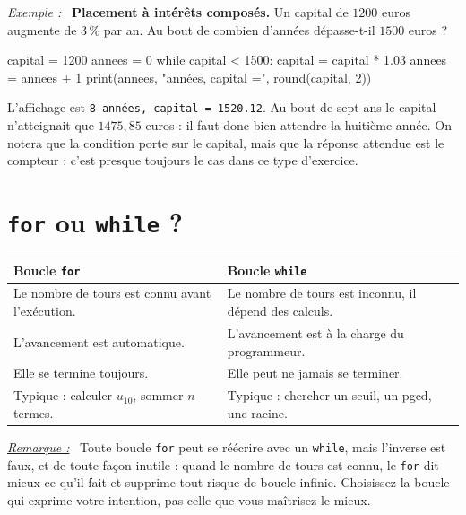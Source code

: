 \documentclass[a4paper,11pt,openany]{book}
\newcommand{\code}[1]{\texttt{\textcolor{codebleu}{#1}}}
\newenvironment{exemple}%
 {\par\vspace{1mm}\begin{list}{}{\leftmargin=1cm \rightmargin=0.5cm}\item[]%
  \textit{Exemple :}~}%
 {\end{list}\vspace{1mm}}
\newenvironment{remarque}%
 {\par\vspace{1mm}\begin{list}{}{\leftmargin=1cm \rightmargin=0.5cm}\item[]%
  \textit{\underline{Remarque :}}~}%
 {\end{list}\vspace{1mm}}
\renewcommand{\arraystretch}{1.4}
\begin{document}
\begin{exemple}
\textbf{Placement à intérêts composés.} Un capital de $1200$ euros augmente de $3\,\%$ par an. Au bout de combien d'années dépasse-t-il $1500$ euros ?
\begin{python}
capital = 1200
annees = 0
while capital < 1500:
    capital = capital * 1.03
    annees = annees + 1
print(annees, "années, capital =", round(capital, 2))
\end{python}
L'affichage est \code{8 années, capital = 1520.12}. Au bout de sept ans le capital n'atteignait que $1475{,}85$ euros : il faut donc bien attendre la huitième année. On notera que la condition porte sur le capital, mais que la réponse attendue est le compteur : c'est presque toujours le cas dans ce type d'exercice.
\end{exemple}

\section{\texttt{for} ou \texttt{while} ?}

\begin{center}
\renewcommand{\arraystretch}{1.5}
\begin{tabular}{|p{6.6cm}|p{6.6cm}|}
\hline
\rowcolor{orange!50} \textbf{Boucle \code{for}} & \textbf{Boucle \code{while}} \\
\hline
Le nombre de tours est connu avant l'exécution. & Le nombre de tours est inconnu, il dépend des calculs. \\
\hline
L'avancement est automatique. & L'avancement est à la charge du programmeur. \\
\hline
Elle se termine toujours. & Elle peut ne jamais se terminer. \\
\hline
Typique : calculer $u_{10}$, sommer $n$ termes. & Typique : chercher un seuil, un pgcd, une racine. \\
\hline
\end{tabular}
\end{center}

\begin{remarque}
Toute boucle \code{for} peut se réécrire avec un \code{while}, mais l'inverse est faux, et de toute façon inutile : quand le nombre de tours est connu, le \code{for} dit mieux ce qu'il fait et supprime tout risque de boucle infinie. Choisissez la boucle qui exprime votre intention, pas celle que vous maîtrisez le mieux.
\end{remarque}
\end{document}
